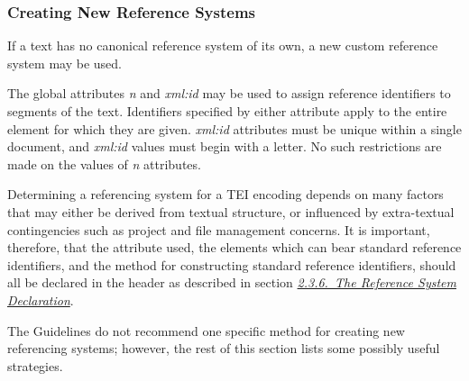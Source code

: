 \subsubsection[{Creating New Reference Systems}]{Creating New Reference Systems}\label{CORS2}\par
If a text has no canonical reference system of its own, a new custom reference system may be used.\par
The global attributes {\itshape n} and {\itshape xml:id} may be used to assign reference identifiers to segments of the text. Identifiers specified by either attribute apply to the entire element for which they are given. {\itshape xml:id} attributes must be unique within a single document, and {\itshape xml:id} values must begin with a letter. No such restrictions are made on the values of {\itshape n} attributes.\par
Determining a referencing system for a TEI encoding depends on many factors that may either be derived from textual structure, or influenced by extra-textual contingencies such as project and file management concerns. It is important, therefore, that the attribute used, the elements which can bear standard reference identifiers, and the method for constructing standard reference identifiers, should all be declared in the header as described in section \textit{\hyperref[HD54]{2.3.6.\ The Reference System Declaration}}.\par
The Guidelines do not recommend one specific method for creating new referencing systems; however, the rest of this section lists some possibly useful strategies.
